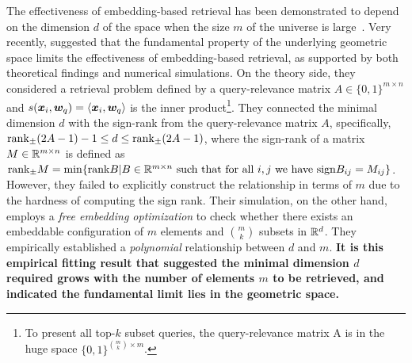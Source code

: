 The effectiveness of embedding-based retrieval has been demonstrated to depend on the dimension $d$ of the space when the size $m$ of the universe is large~\citep{yin2018dimensionality,reimers2021curse}. Very recently, \citet{weller2025theoretical} suggested that the fundamental property of the underlying geometric space limits the effectiveness of embedding-based retrieval, as supported by both theoretical findings and numerical simulations. On the theory side, they considered a retrieval problem defined by a query-relevance matrix $A\in \{0, 1\}^{m\times n}$ and $s(\bm{x}_i, \bm{w}_q) = \langle \bm{x}_i, \bm{w}_q \rangle$ is the inner product\footnote{To present all top-$k$ subset queries, the query-relevance matrix A  is in the huge space $\{0,1\}^{\binom{m}{k} \times m}$.}. They connected the minimal dimension $d$ with the sign-rank from the query-relevance matrix $A$, specifically, ${\rm rank}_{\pm} (2A-1) - 1 \leq d \leq {\rm rank}_{\pm} (2A-1) $, where the sign-rank of a matrix $M\in \mathbb{R}^{m\times n}$ is defined as ${\rm rank}_{\pm} M = \min\{{\rm rank} B | B\in \mathbb{R}^{m\times n} \text{ such that for all } i, j \text{ we have } {\rm sign}B_{ij} = M_{ij}\}$. However, they failed to explicitly construct the relationship in terms of $m$ due to the hardness of computing the sign rank.
Their simulation, on the other hand, employs a \textit{free embedding optimization} to check whether there exists an embeddable configuration of $m$ elements and $\binom{m}{k}$ subsets in $\mathbb{R}^d$. They empirically established a \textit{polynomial} relationship between $d$ and $m$. \textbf{It is this empirical fitting result that suggested the minimal dimension $d$ required grows with the number of elements $m$ to be retrieved, and indicated the fundamental limit lies in the geometric space.}


